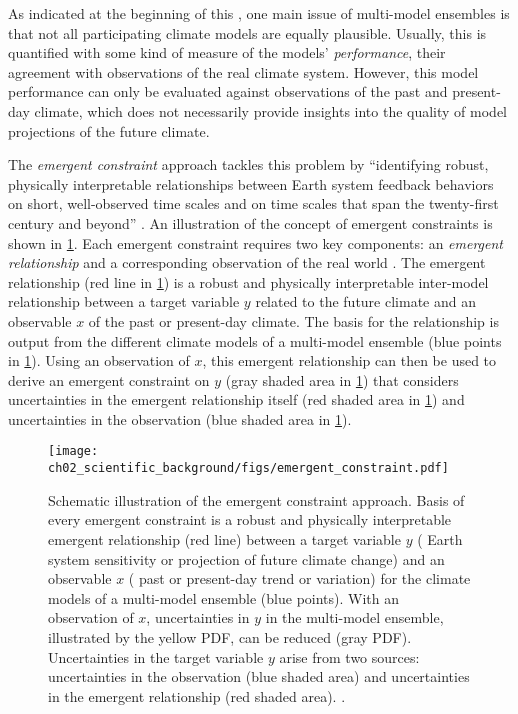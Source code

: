 As indicated at the beginning of this
, one main issue of multi-model
ensembles is that not all participating climate models are equally plausible.
Usually, this is quantified with some kind of measure of the models'
\emph{performance}, \ie{} their agreement with observations of the real climate
system. However, this model performance can only be evaluated against
observations of the past and present-day climate, which does not necessarily
provide insights into the quality of model projections of the future climate.

The \emph{emergent constraint} approach tackles this problem by
\enquote{identifying robust, physically interpretable relationships between
  Earth system feedback behaviors on short, well-observed time scales and on
  time scales that span the twenty-first century and beyond}
\autocite{Eyring2019}. An illustration of the concept of emergent constraints
is shown in \cref{fig:02:emergent_constraint}. Each emergent constraint
requires two key components: an \emph{emergent relationship} and a
corresponding observation of the real world \autocite{Eyring2019}. The
emergent relationship (red line in \cref{fig:02:emergent_constraint}) is a
robust and physically interpretable inter-model relationship between a target
variable $y$ related to the future climate and an observable $x$ of the past
or present-day climate. The basis for the relationship is output from the
different climate models of a multi-model ensemble (blue points in
\cref{fig:02:emergent_constraint}). Using an observation of $x$, this
emergent relationship can then be used to derive an emergent constraint on
$y$ (gray shaded area in \cref{fig:02:emergent_constraint}) that considers
uncertainties in the emergent relationship itself (red shaded area in
\cref{fig:02:emergent_constraint}) and uncertainties in the observation (blue
shaded area in \cref{fig:02:emergent_constraint}).

\begin{figure}[t]
  \centering
  \texttt{[image: 
    ch02\_scientific\_background/figs/emergent\_constraint.pdf]}
  \caption[
    Schematic illustration of the emergent constraint approach.
  ]{
    Schematic illustration of the emergent constraint approach. Basis of every
    emergent constraint is a robust and physically interpretable emergent
    relationship (red line) between a target variable $y$ (\eg{} Earth system
    sensitivity or projection of future climate change) and an observable $x$
    (\eg{} past or present-day trend or variation) for the climate models of a
    multi-model ensemble (blue points). With an observation of $x$,
    uncertainties in $y$ in the multi-model ensemble, illustrated by the yellow
    \acf{PDF}, can be reduced (gray \acs{PDF}). Uncertainties in the target
    variable $y$ arise from two sources: uncertainties in the observation (blue
    shaded area) and uncertainties in the emergent relationship (red shaded
    area). .
  }
  \label{fig:02:emergent_constraint}
\end{figure}

